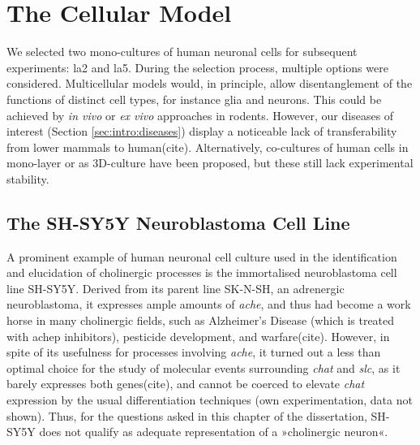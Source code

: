 \section{The Cellular Model}
We selected two mono-cultures of human neuronal cells for subsequent experiments: \acs{la2} and \acs{la5}. During the selection process, multiple options were considered. Multicellular models would, in principle, allow disentanglement of the functions of distinct cell types, for instance glia and neurons. This could be achieved by \emph{in vivo} or \emph{ex vivo} approaches in rodents. However, our diseases of interest (Section \ref{sec:intro:diseases}) display a noticeable lack of transferability from lower mammals to human(cite). Alternatively, co-cultures of human cells in mono-layer or as 3D-culture have been proposed, but these still lack experimental stability.

\subsection{The SH-SY5Y Neuroblastoma Cell Line}
A prominent example of human neuronal cell culture used in the identification and elucidation of cholinergic processes is the immortalised neuroblastoma cell line SH-SY5Y.\cite{Biedler1978} Derived from its parent line SK-N-SH, an adrenergic neuroblastoma,\cite{Biedler1973} it expresses ample amounts of \textit{\ac{ache}}, and thus had become a work horse in many cholinergic fields, such as Alzheimer's Disease (which is treated with \ac{achep} inhibitors), pesticide development, and warfare(cite). However, in spite of its usefulness for processes involving \textit{\ac{ache}}, it turned out a less than optimal choice for the study of molecular events surrounding \textit{\ac{chat}} and \textit{\ac{slc}}, as it barely expresses both genes(cite), and cannot be coerced to elevate \textit{\ac{chat}} expression by the usual differentiation techniques (own experimentation, data not shown). Thus, for the questions asked in this chapter of the dissertation, SH-SY5Y does not qualify as adequate representation of a »cholinergic neuron«.

